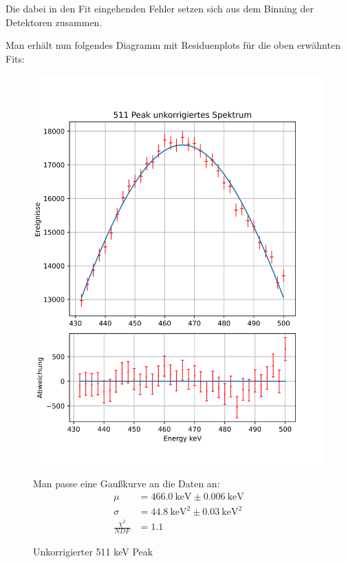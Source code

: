 \documentclass[12pt,twoside,a4paper]{scrartcl}
\begin{document}
		Die dabei in den Fit eingehenden Fehler setzen sich aus dem Binning der Detektoren zusammen.

		Man erhält nun folgendes Diagramm mit Residuenplots für die oben erwähnten Fits:

		\begin{figure}[H]
			\begin{minipage}{0.49 \textwidth}
				\includegraphics[width = \textwidth]{Plots/EnergyUnkorrigiert511 Peak.png}
				\caption{Unkorrigierter 511 keV Peak}
			\end{minipage}
			\begin{minipage}{0.49 \textwidth}
				Man passe eine Gaußkurve an die Daten an:
				\begin{align*}
					\mu &= \SI{466.0}{\kilo \electronvolt} \pm \SI{0.006}{\kilo \electronvolt} \\
					\sigma &= \SI{44.8}{\kilo \electronvolt \squared} \pm \SI{0.03}{\kilo \electronvolt \squared} \\
					\frac{\chi^2}{NDF} &= 1.1
				\end{align*}
			\end{minipage}
		\end{figure}
\end{document}
